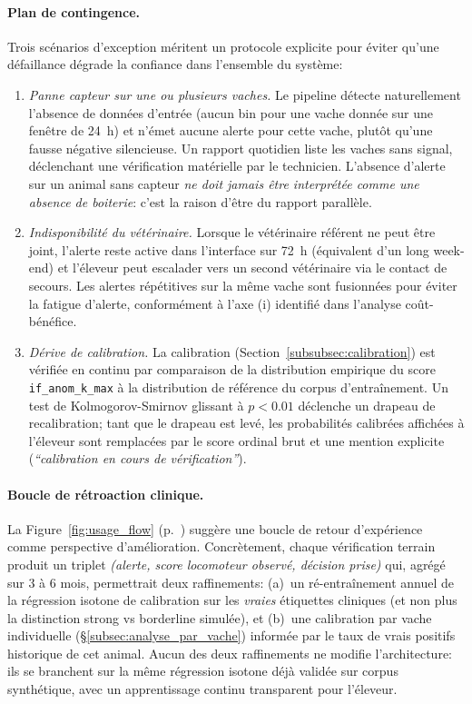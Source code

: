 \paragraph{Plan de contingence.}
Trois scénarios d'exception méritent un protocole explicite pour
éviter qu'une défaillance dégrade la confiance dans l'ensemble du
système:
\begin{enumerate}
    \item \textit{Panne capteur sur une ou plusieurs vaches.} Le
    pipeline détecte naturellement l'absence de données d'entrée
    (aucun bin pour une vache donnée sur une fenêtre de 24~h) et
    n'émet aucune alerte pour cette vache, plutôt qu'une fausse
    négative silencieuse. Un rapport quotidien liste les vaches
    sans signal, déclenchant une vérification matérielle par le
    technicien. L'absence d'alerte sur un animal sans capteur
    \emph{ne doit jamais être interprétée comme une absence de
    boiterie}: c'est la raison d'être du rapport parallèle.
    \item \textit{Indisponibilité du vétérinaire.} Lorsque le
    vétérinaire référent ne peut être joint, l'alerte reste active
    dans l'interface sur 72~h (équivalent d'un long week-end) et
    l'éleveur peut escalader vers un second vétérinaire via le
    contact de secours. Les alertes répétitives sur la même vache
    sont fusionnées pour éviter la fatigue d'alerte, conformément
    à l'axe (i) identifié dans l'analyse coût-bénéfice.
    \item \textit{Dérive de calibration.} La calibration
    (Section~\ref{subsubsec:calibration}) est vérifiée en continu
    par comparaison de la distribution empirique du score
    \texttt{if\_anom\_k\_max} à la distribution de référence du
    corpus d'entraînement. Un test de Kolmogorov-Smirnov glissant
    à $p < 0.01$ déclenche un drapeau de recalibration; tant que
    le drapeau est levé, les probabilités calibrées affichées à
    l'éleveur sont remplacées par le score ordinal brut et une
    mention explicite (\emph{``calibration en cours de
    vérification''}).
\end{enumerate}

\paragraph{Boucle de rétroaction clinique.}
La Figure~\ref{fig:usage_flow} (p.~\pageref{fig:usage_flow}) suggère
une boucle de retour d'expérience comme perspective d'amélioration.
Concrètement, chaque vérification terrain produit un triplet
\emph{(alerte, score locomoteur observé, décision prise)} qui,
agrégé sur 3 à 6 mois, permettrait deux raffinements: (a)~un
ré-entraînement annuel de la régression isotone de calibration sur
les \emph{vraies} étiquettes cliniques (et non plus la distinction
strong vs borderline simulée), et (b)~une calibration par vache
individuelle (\S\ref{subsec:analyse_par_vache}) informée par le
taux de vrais positifs historique de cet animal. Aucun des deux
raffinements ne modifie l'architecture: ils se branchent sur la
même régression isotone déjà validée sur corpus synthétique, avec
un apprentissage continu transparent pour l'éleveur.

